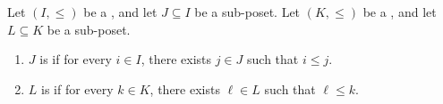 \begin{definition} \label{definition:cofinal_and_final_sub_posets}
Let $(I, \leq)$ be a , and let $J \subseteq I$ be a sub-poset. Let $(K, \leq)$ be a , and let $L \subseteq K$ be a sub-poset.
\begin{enumerate}
    \item $J$ is  if for every $i \in I$, there exists $j \in J$ such that $i \leq j$.

    \item $L$ is  if for every $k \in K$, there exists $\ell \in L$ such that $\ell \leq k$.
\end{enumerate}
\end{definition}

